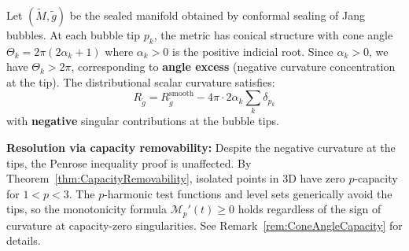 \begin{lemma}\label{lem:ConeAngleSign}
Let $(\tilde{M}, \tilde{g})$ be the sealed manifold obtained by conformal sealing of Jang bubbles. At each bubble tip $p_k$, the metric has conical structure with cone angle $\Theta_k = 2\pi(2\alpha_k + 1)$ where $\alpha_k > 0$ is the positive indicial root. Since $\alpha_k > 0$, we have $\Theta_k > 2\pi$, corresponding to \textbf{angle excess} (negative curvature concentration at the tip). The distributional scalar curvature satisfies:
\begin{equation}
    R_{\tilde{g}} = R_{\tilde{g}}^{\text{smooth}} - 4\pi \cdot 2\alpha_k \sum_k \delta_{p_k}
\end{equation}
with \textbf{negative} singular contributions at the bubble tips.

\textbf{Resolution via capacity removability:} Despite the negative curvature at the tips, the Penrose inequality proof is unaffected. By Theorem~\ref{thm:CapacityRemovability}, isolated points in 3D have zero $p$-capacity for $1 < p < 3$. The $p$-harmonic test functions and level sets generically avoid the tips, so the monotonicity formula $\mathcal{M}_p'(t) \ge 0$ holds regardless of the sign of curvature at capacity-zero singularities. See Remark~\ref{rem:ConeAngleCapacity} for details.
\end{lemma}

